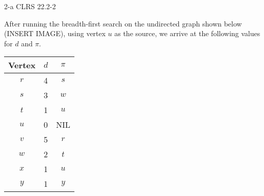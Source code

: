 \documentclass[11pt]{article}
\begin{document}
\begin{prob}{2-a}
CLRS 22.2-2
\end{prob}
\begin{sol} 

After running the breadth-first search on the undirected graph shown below (INSERT IMAGE), using vertex $u$ as the source, we arrive at the following values for $d$ and $\pi$.

\begin{center}
  \begin{tabular}{| c | c  c |}
    \hline
	Vertex & $d$ & $\pi$ \\ \hline
	$r$ & 4 & $s$ \\
	$s$ & 3 & $w$ \\
	$t$ & 1 & $u$ \\
	$u$ & 0 & NIL\\ 
	$v$ & 5 & $r$\\ 
	$w$ & 2 & $t$\\
	$x$ & 1 & $u$\\
	$y$ & 1 & $y$\\ \hline
  \end{tabular}
\end{center}

\end{sol}
\end{document}
